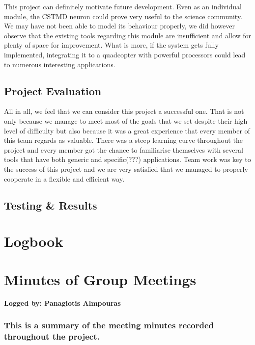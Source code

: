 \documentclass[a4paper,11pt]{article}
\begin{document}
This project can definitely motivate future development.  Even as an individual module, the CSTMD 
neuron could prove very useful to the science community. We may have not been able to model its 
behaviour properly, we did however observe that the existing tools regarding this module are 
insufficient and allow for plenty of space for improvement. What is more, if the system gets fully 
implemented, integrating it to a quadcopter with powerful processors could lead to numerous 
interesting applications.

\subsection{Project Evaluation}

All in all, we feel that we can consider this project a successful one. That is not only because we 
manage to meet most of the goals that we set despite their high level of difficulty but also because it 
was a great experience that every member of this team regards as valuable. There was a steep 
learning curve throughout the project and every member got the chance to familiarise themselves 
with several tools that have both generic and specific(???) applications. Team work was key to the 
success of this project and we are very satisfied that we managed to properly cooperate in a flexible 
and efficient way.


\subsection{Testing \& Results}





\clearpage

{}

\clearpage
\appendix
\section{Logbook}

\clearpage
\section{Minutes of Group Meetings}
\textbf{Logged by: Panagiotis Almpouras}
\subsubsection*{This is a summary of the meeting minutes recorded throughout the project.}
\maketitle
\end{document}
